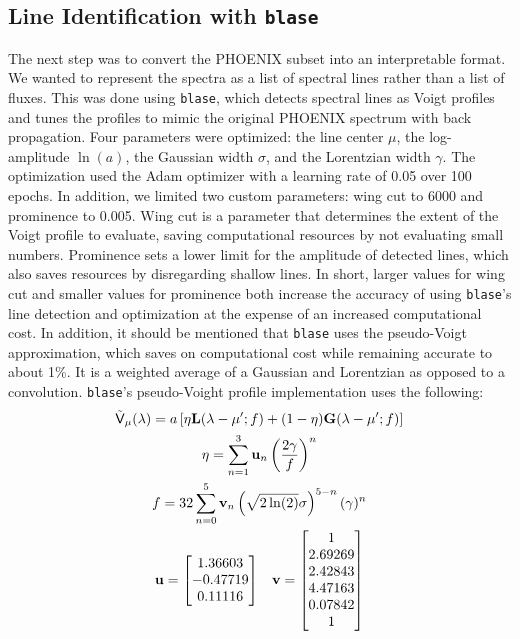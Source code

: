 \documentclass[twocolumn]{aastex631}
\begin{document}
\subsection{Line Identification with \texttt{blase}}
The next step was to convert the PHOENIX subset into an interpretable format.
We wanted to represent the spectra as a list of spectral lines rather than a
list of fluxes. This was done using \texttt{blase}, which detects spectral 
lines as Voigt profiles and tunes the profiles to mimic the original 
PHOENIX spectrum with back propagation. Four parameters were optimized: the 
line center $\mu$, the log-amplitude $\ln(a)$, the Gaussian width $\sigma$, and the 
Lorentzian width $\gamma$. The optimization used the Adam optimizer with a
learning rate of 0.05 over 100 epochs. In addition, we limited two custom 
parameters: wing cut to 6000 and prominence to 0.005. Wing cut is a parameter
that determines the extent of the Voigt profile to evaluate, saving
computational resources by not evaluating small numbers. Prominence sets a
lower limit for the amplitude of detected lines, which also saves resources 
by disregarding shallow lines. In short, larger values for wing cut and 
smaller values for prominence both increase the accuracy of using
\texttt{blase}'s line detection and optimization at the expense of an
increased computational cost. In addition, it should be mentioned that
\texttt{blase} uses the pseudo-Voigt approximation, which saves on 
computational cost while remaining accurate to about 1\%. It is a 
weighted average of a Gaussian and Lorentzian as opposed to a convolution.
\texttt{blase}'s pseudo-Voight profile implementation uses the following:
\begin{subequations}
\begin{gather}
    \tilde{\mathsf{V}}_\mu(\lambda) = a\left[\eta \mathbf{L}(\lambda - \mu'; f) + (1 - \eta)\mathbf{G}(\lambda - \mu'; f)\right]\\
    \eta = \sum_{n=1}^3 \mathbf{u}_n\left(\dfrac{2\gamma}{f}\right)^n\\
    f = 32\sum_{n=0}^5 \mathbf{v}_n \left(\sqrt{2\ln(2)}\sigma\right)^{5-n}(\gamma)^n\\
    \nonumber \mathbf{u} = \mqty[1.36603 \\ -0.47719 \\ 0.11116] \quad \mathbf{v} = \mqty[1 \\ 2.69269 \\ 2.42843 \\ 4.47163 \\ 0.07842 \\ 1]
\end{gather}
\end{subequations}
\end{document}
